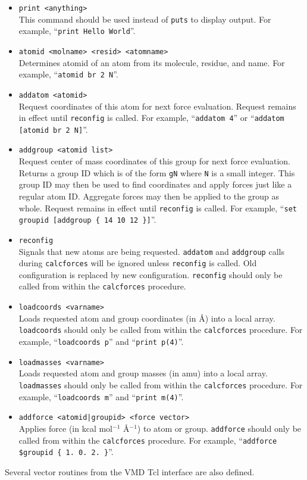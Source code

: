 \begin{itemize}

\item
\verb!print <anything>! \\
This command should be used instead of \verb!puts! to display output.
For example, ``\verb&print Hello World&''.

\item
\verb!atomid <molname> <resid> <atomname>! \\
Determines atomid of an atom from its molecule, residue, and name.
For example, ``\verb!atomid br 2 N!''.

\item
\verb!addatom <atomid>! \\
Request coordinates of this atom for next force evaluation.
Request remains in effect until \verb!reconfig! is called.
For example, ``\verb!addatom 4!'' or ``\verb!addatom [atomid br 2 N]!''.

\item
\verb!addgroup <atomid list>! \\
Request center of mass coordinates of this group for next force evaluation.
Returns a group ID which is of the form \verb!gN! where \verb!N! is a small integer.
This group ID may then be used to find coordinates and apply forces just like a regular atom ID.
Aggregate forces may then be applied to the group as whole.
Request remains in effect until \verb!reconfig! is called.
For example, ``\verb!set groupid [addgroup { 14 10 12 }]!''.

\item
\verb!reconfig! \\
Signals that new atoms are being requested.
\verb!addatom! and \verb!addgroup! calls during \verb!calcforces! will be ignored unless \verb!reconfig! is called.
Old configuration is replaced by new configuration.
\verb!reconfig! should only be called from within the \verb!calcforces! procedure.

\item
\verb!loadcoords <varname>! \\
Loads requested atom and group coordinates (in \AA) into a local array.
\verb!loadcoords! should only be called from within the \verb!calcforces! procedure.
For example, ``\verb!loadcoords p!'' and ``\verb!print p(4)!''.

\item
\verb!loadmasses <varname>! \\
Loads requested atom and group masses (in amu) into a local array.
\verb!loadmasses! should only be called from within the \verb!calcforces! procedure.
For example, ``\verb!loadcoords m!'' and ``\verb!print m(4)!''.

\item
\verb!addforce <atomid|groupid> <force vector>! \\
Applies force (in kcal mol$^{-1}$ \AA$^{-1}$) to atom or group.
\verb!addforce! should only be called from within the \verb!calcforces! procedure.
For example, ``\verb!addforce $groupid { 1. 0. 2. }!''.

\end{itemize}

Several vector routines from the VMD Tcl interface are also defined.


